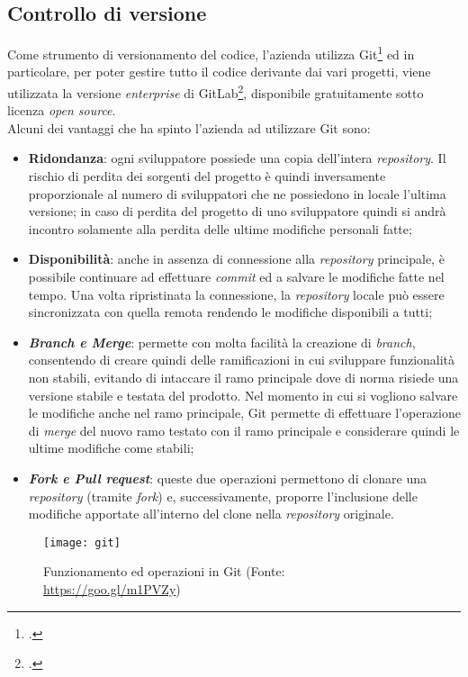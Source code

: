 \subsection{Controllo di versione}
Come strumento di versionamento del codice, l’azienda utilizza \gls{Git}\footcite{https://git-scm.com/} ed in particolare, per poter gestire tutto il codice derivante dai vari progetti, viene utilizzata la versione \textit{enterprise} di \gls{GitLab}\footcite{https://about.gitlab.com/}, disponibile gratuitamente sotto licenza \textit{open source}.\\
Alcuni dei vantaggi che ha spinto l’azienda ad utilizzare Git sono:
\begin{itemize}
	\item \textbf{Ridondanza}: ogni sviluppatore possiede una copia dell’intera \textit{repository}. Il rischio di perdita dei sorgenti del progetto è quindi inversamente proporzionale al numero di sviluppatori che ne possiedono in locale l’ultima versione; in caso di perdita del progetto di uno sviluppatore quindi si andrà incontro solamente alla perdita delle ultime modifiche personali fatte;
	\item \textbf{Disponibilità}: anche in assenza di connessione alla \textit{repository} principale, è possibile continuare ad effettuare \textit{commit} ed a salvare le modifiche fatte nel tempo. Una volta ripristinata la connessione, la \textit{repository} locale può essere sincronizzata con quella remota rendendo le modifiche disponibili a tutti;
	\item \textit{\textbf{Branch e Merge}}: permette con molta facilità la creazione di \textit{branch}, consentendo di creare quindi delle ramificazioni in cui sviluppare funzionalità non stabili, evitando di intaccare il ramo principale dove di norma risiede una versione stabile e testata del prodotto. Nel momento in cui si vogliono salvare le modifiche anche nel ramo principale, \gls{Git} permette di effettuare l’operazione di \textit{merge} del nuovo ramo testato con il ramo principale e considerare quindi le ultime modifiche come stabili;
	\item \textit{\textbf{Fork e Pull request}}: queste due operazioni permettono di clonare una \textit{repository} (tramite \textit{fork}) e, successivamente, proporre l’inclusione delle modifiche apportate all’interno del clone nella \textit{repository} originale.
\end{itemize}
\begin{figure}[!h] 
	\centering 
	\texttt{[image: git]} 
	\caption{Funzionamento ed operazioni in Git (Fonte: \href{https://goo.gl/m1PVZy}{https://goo.gl/m1PVZy})}
\end{figure}


